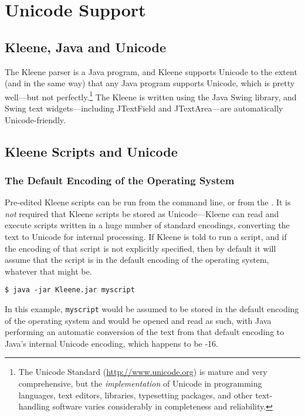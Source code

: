 
\chapter{Unicode Support}

\section{Kleene, Java and Unicode}

The Kleene parser is a Java program, and Kleene supports Unicode to the extent (and
in the same way) that any Java program supports Unicode, which is pretty well---but
not perfectly.\footnote{The Unicode Standard (\url{http://www.unicode.org})
is mature and very comprehensive, but
the \emph{implementation} of Unicode in programming languages, 
text editors,  libraries,
typesetting packages, and other text-handling software varies considerably in completeness
and reliability.}  The
Kleene  is written using the Java Swing library, and Swing text
widgets---including JTextField and JTextArea---are automatically Unicode-friendly.  

\section{Kleene Scripts and Unicode}

\subsection{The Default Encoding of the Operating System}

Pre-edited Kleene scripts can be run from the command line, or from the .
It is \emph{not} required that Kleene scripts be stored as Unicode---Kleene can
read and execute scripts written in a huge number of standard encodings, converting the text to Unicode for
internal processing.  If Kleene is told to run a script, and if the encoding of that script is not
explicitly specified, then by default it will assume that the script is in the
default encoding of the operating system, whatever that might be.

\begin{Verbatim}
$ java -jar Kleene.jar myscript
\end{Verbatim}

\noindent
In this example, \texttt{myscript} would be assumed to be stored in the default encoding
of the operating system and would be opened and read as such, with Java performing
an automatic conversion of the text from that default encoding to Java's internal
Unicode encoding, which happens to be -16.

